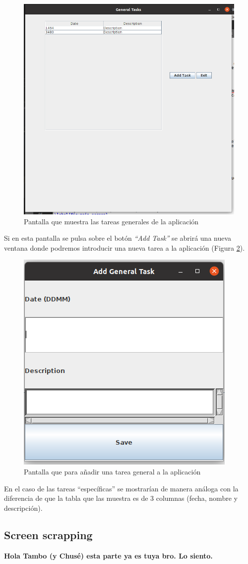 \documentclass[10pt,a4paper]{article}
\begin{document}
\newpage
\begin{figure}[h!]
\centering
\includegraphics[scale=0.4]{images/general_task_screen.png}
\caption{Pantalla que muestra las tareas generales de la aplicación}
\label{fig:general_task_screen}
\end{figure}

Si en esta pantalla se pulsa sobre el botón \emph{``Add Task''} se abrirá una nueva ventana donde podremos introducir una nueva tarea a la aplicación (Figura \ref{fig:add_general_task_screen}).

\begin{figure}[h!]
\centering
\includegraphics[scale=0.6]{images/add_general_task_screen.png}
\caption{Pantalla que para añadir una tarea general a la aplicación}
\label{fig:add_general_task_screen}
\end{figure}

En el caso de las tareas ``específicas'' se mostrarían de manera análoga con la diferencia de que la tabla que las muestra es de 3 columnas (fecha, nombre y descripción).


\subsection{Screen scrapping}

\textbf{{\Huge Hola Tambo (y Chusé) esta parte ya es tuya bro. Lo siento.}}
\end{document}

